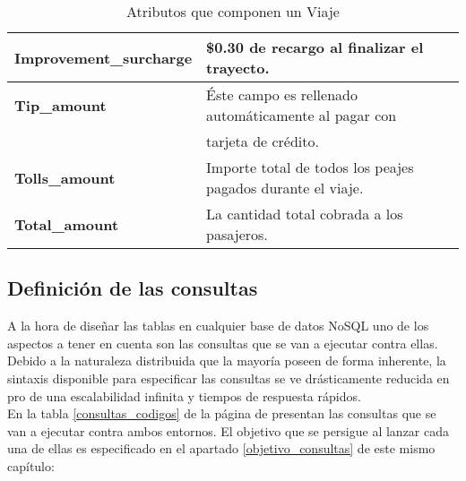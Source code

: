 \begin{table}[h!]
\begin{tabular}{|l||l|}
		\hline
	
		\textbf{Improvement\_surcharge} & \$0.30 de recargo al finalizar el trayecto. \\
		
		\hline
		
		\textbf{Tip\_amount} & Éste campo es rellenado automáticamente al pagar con \\
		                     & tarjeta de crédito. \\
		
		\hline
		 
		\textbf{Tolls\_amount} & Importe total de todos los peajes pagados durante el viaje.  \\
		
		\hline
		 
		\textbf{Total\_amount} & La cantidad total cobrada a los pasajeros. \\
		
		\hline
		
	\end{tabular}
	\caption{Atributos que componen un Viaje}
	\label{atributos_trip}
\end{table}

\subsection{Definición de las consultas}
\label{definicion_consultas}

A la hora de diseñar las tablas en cualquier base de datos NoSQL uno de los aspectos a tener en cuenta son las consultas que se van a ejecutar contra ellas. Debido a la naturaleza distribuida que la mayoría poseen de forma inherente, la sintaxis disponible para especificar las consultas se ve drásticamente reducida en pro de una escalabilidad infinita y tiempos de respuesta rápidos.\\

En la tabla \ref{consultas_codigos} de la página \pageref{consultas_codigos} de presentan las consultas que se van a ejecutar contra ambos entornos. El objetivo que se persigue al lanzar cada una de ellas es especificado en el apartado \ref{objetivo_consultas} de este mismo capítulo:\\

